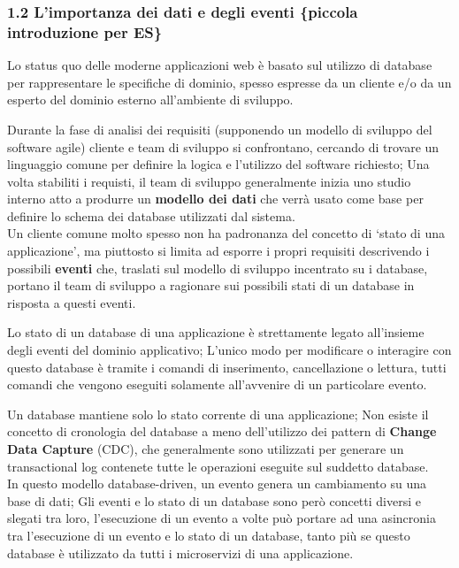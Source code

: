 \documentclass[]{article}
\begin{document}
\subsubsection{1.2 L'importanza dei dati e degli eventi \{piccola
introduzione per
ES\}}\label{limportanza-dei-dati-e-degli-eventi-piccola-introduzione-per-es}

Lo status quo delle moderne applicazioni web è basato sul utilizzo di
database per rappresentare le specifiche di dominio, spesso espresse da
un cliente e/o da un esperto del dominio esterno all'ambiente di
sviluppo.

Durante la fase di analisi dei requisiti (supponendo un modello di
sviluppo del software agile) cliente e team di sviluppo si confrontano,
cercando di trovare un linguaggio comune per definire la logica e
l'utilizzo del software richiesto; Una volta stabiliti i requisti, il
team di sviluppo generalmente inizia uno studio interno atto a produrre
un \textbf{modello dei dati} che verrà usato come base per definire lo
schema dei database utilizzati dal sistema.\\
Un cliente comune molto spesso non ha padronanza del concetto di `stato
di una applicazione', ma piuttosto si limita ad esporre i propri
requisiti descrivendo i possibili \textbf{eventi} che, traslati sul
modello di sviluppo incentrato su i database, portano il team di
sviluppo a ragionare sui possibili stati di un database in risposta a
questi eventi.

Lo stato di un database di una applicazione è strettamente legato
all'insieme degli eventi del dominio applicativo; L'unico modo per
modificare o interagire con questo database è tramite i comandi di
inserimento, cancellazione o lettura, tutti comandi che vengono eseguiti
solamente all'avvenire di un particolare evento.

Un database mantiene solo lo stato corrente di una applicazione; Non
esiste il concetto di cronologia del database a meno dell'utilizzo dei
pattern di \textbf{Change Data Capture} (CDC), che generalmente sono
utilizzati per generare un transactional log contenete tutte le
operazioni eseguite sul suddetto database.\\
In questo modello database-driven, un evento genera un cambiamento su
una base di dati; Gli eventi e lo stato di un database sono però
concetti diversi e slegati tra loro, l'esecuzione di un evento a volte
può portare ad una asincronia tra l'esecuzione di un evento e lo stato
di un database, tanto più se questo database è utilizzato da tutti i
microservizi di una applicazione.
\end{document}
